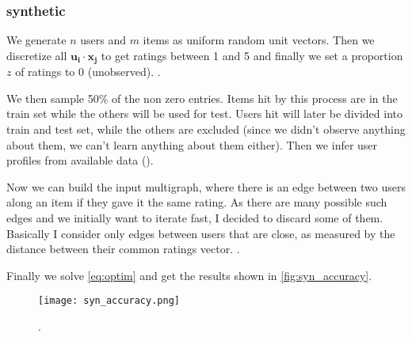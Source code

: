 \subsubsection{synthetic}

We generate $n$ users and $m$ items as uniform random unit vectors. Then we
discretize all $\bm{u_i}\cdot \bm{x_j}$ to get ratings between 1 and 5 and
finally we set a proportion $z$ of ratings to 0 (unobserved). .

We then sample 50\% of the non zero entries. Items hit by this process are in
the train set while the others will be used for test. Users hit will later be
divided into train and test set, while the others are excluded (since we
didn't observe anything about them, we can't learn anything about them either).
Then we infer user profiles from available data ().

Now we can build the input multigraph, where there is an edge between two users
along an item if they gave it the same rating. As there are many possible such
edges and we initially want to iterate fast, I decided to discard some of them.
Basically I consider only edges between users that are close, as measured by
the distance between their common ratings vector. .

Finally we solve \eqref{eq:optim} and get the results shown in
\autoref{fig:syn_accuracy}.

\begin{figure}[hb]
	\centering
	\texttt{[image: syn\_accuracy.png]}
	\caption{.\label{fig:syn_accuracy}}
\end{figure}
